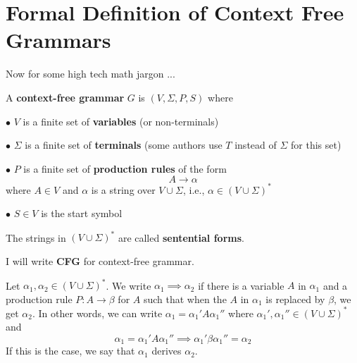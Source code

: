 





\newpage
\section{Formal Definition of Context Free Grammars}

Now for some high tech math jargon ...

\begin{defn}
A \textbf{context-free grammar} $G$ is $(V, \Sigma, P, S)$ where
\begin{mylist}
 \item[$\bullet$] $V$ is a finite set of \textbf{variables} (or non-terminals)
 \item[$\bullet$] $\Sigma$ is a finite set of \textbf{terminals}
 (some authors use $T$ instead of $\Sigma$ for this set)
 \item[$\bullet$] $P$ is a finite set of
 \textbf{production rules} of the form
  \[
  A \rightarrow \alpha
  \]
  where $A \in V$ and $\alpha$ is a string over $V \cup \Sigma$, i.e.,
  $\alpha \in (V\cup \Sigma)^*$
 \item[$\bullet$] $S \in V$ is the start symbol
\end{mylist}
The strings in $(V \cup \Sigma)^*$ are called
\textbf{sentential forms}.

I will write \textbf{CFG} for context-free grammar.

Let $\alpha_1, \alpha_2 \in (V \cup \Sigma)^*$.
We write $\alpha_1 \implies \alpha_2$ if there is a variable $A$ in $\alpha_1$
and a production rule $P: A \rightarrow \beta$ for $A$ such that 
when the $A$ in $\alpha_1$ is replaced by $\beta$, we get $\alpha_2$.
In other words, we can write $\alpha_1 = \alpha_1' A \alpha_1''$ where
$\alpha_1', \alpha_1'' \in (V \cup \Sigma)^*$ and 
\[
\alpha_1 
= \alpha_1' A \alpha_1'' \implies \alpha_1' \beta \alpha_1'' = \alpha_2
\]
If this is the case, we say that $\alpha_1$ derives $\alpha_2$.
\end{defn}


